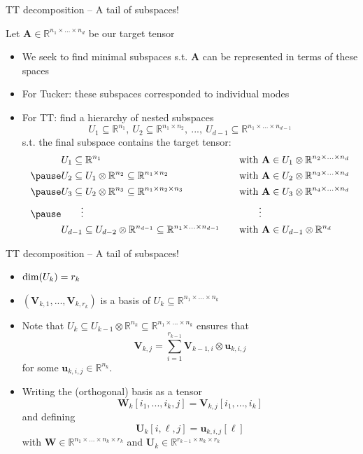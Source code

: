 \documentclass{beamer}
\newcommand{\bvec}[1]{\mathbf{#1}}
\newcommand{\vu}{\bvec{u}}
\newcommand{\vA}{\bvec{A}}
\newcommand{\vU}{\bvec{U}}
\newcommand{\vV}{\bvec{V}}
\newcommand{\vW}{\bvec{W}}
\newcommand{\bitem}{\item[$\bullet$]}
\begin{document}
\begin{frame}{TT decomposition -- A tail of subspaces!}

Let $\vA \in \mathbb{R}^{n_1\times ... \times n_d}$ be our target tensor
\pause
\begin{itemize}
    \bitem We seek to find minimal subspaces s.t. $\vA$ can be represented in terms of these spaces\pause
    \pause
    \bitem For Tucker: these subspaces corresponded to individual modes \pause
    \bitem For TT: find a hierarchy of nested subspaces 
    $$U_1 \subseteq\mathbb{R}^{n_1} ,~ U_2 \subseteq\mathbb{R}^{n_1 \times n_2} ,~ ... ,~ U_{d-1} \subseteq\mathbb{R}^{n_1 \times ... \times  n_{d-1}} $$ 
    s.t. the final subspace contains the target tensor:
$$
\begin{aligned}
&U_1 \subseteq \mathbb{R}^{n_1} &&{\rm with}~ \vA \in U_1\otimes \mathbb{R}^{n_2\times... \times n_d} \\
\pause
&U_2 \subseteq U_1\otimes \mathbb{R}^{n_2}\subseteq \mathbb{R}^{n_1\times n_{2}} &&{\rm with}~ \vA \in U_2\otimes \mathbb{R}^{n_3\times... \times n_d} \\
\pause
&U_3 \subseteq U_2\otimes \mathbb{R}^{n_3}\subseteq \mathbb{R}^{n_1\times n_2 \times n_{3}} &&{\rm with}~ \vA \in U_3\otimes \mathbb{R}^{n_4\times... \times n_d} \\
\pause
&\qquad \vdots&& \qquad \vdots\\
&U_{d-1} \subseteq U_{d-2}\otimes \mathbb{R}^{n_{d-1}} \subseteq \mathbb{R}^{n_1\times ... \times n_{d-1}}\quad &&{\rm with}~ \vA \in U_{d-1}\otimes \mathbb{R}^{n_d} \\
\end{aligned}
$$
\end{itemize}

\end{frame}

\begin{frame}{TT decomposition -- A tail of subspaces!}

\begin{itemize}
    \bitem ${\rm dim}(U_k) = r_k$ \pause
    \bitem $(\vV_{k,1},...,\vV_{k,r_k})$ is a basis of $U_k \subseteq \mathbb{R}^{n_1\times ... \times n_k}$  \pause
    \bitem Note that $U_k \subseteq U_{k-1}\otimes \mathbb{R}^{n_k} \subseteq \mathbb{R}^{n_1\times ... \times n_k}$ ensures that 
    $$
    \vV_{k,j} = \sum_{i=1}^{r_{k-1}} \vV_{k-1,i}\otimes \vu_{k,i,j} 
    $$
    for some $\vu_{k,i,j} \in \mathbb{R}^{n_k}$.
    \pause
    \bitem Writing the (orthogonal) basis as a tensor
    $$
    \vW_k[i_1,...,i_k,j]
    =
    \vV_{k,j}[i_1,...,i_k] 
    $$
    and defining 
    $$
    \vU_k[i,\ell,j]
    =
    \vu_{k,i,j}[\ell]
    $$
    \pause
    with $\vW \in \mathbb{R}^{n_1\times ... \times n_k \times r_k}$ 
    and $\vU_{k} \in \mathbb{R}^{r_{k-1} \times n_k \times r_k}$
\end{itemize}
    
\end{frame}
\end{document}
